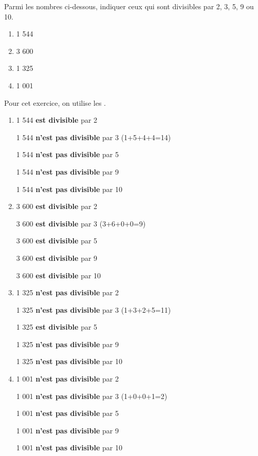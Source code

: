 
Parmi les nombres ci-dessous, indiquer ceux qui sont divisibles par 2, 3, 5, 9 ou 10.
\begin{enumerate}
     \item 1 544
     \item 3 600
     \item 1 325
     \item 1 001
\end{enumerate}
\begin{corrige}
Pour cet exercice, on utilise les .
     \begin{enumerate}
          \item 1 544 \textbf{est divisible} par 2
          \par
          1 544 \textbf{n'est pas divisible} par 3 (1+5+4+4=14)
          \par
          1 544 \textbf{n'est pas divisible} par 5
          \par
          1 544 \textbf{n'est pas divisible} par 9
          \par
          1 544 \textbf{n'est pas divisible} par 10
          \item 3 600\textbf{ est divisible} par 2
          \par
          3 600 \textbf{est divisible} par 3 (3+6+0+0=9)
          \par
          3 600 \textbf{est divisible} par 5
          \par
          3 600 \textbf{est divisible} par 9
          \par
          3 600 \textbf{est divisible} par 10
          \item 1 325\textbf{ n'est pas divisible} par 2
          \par
          1 325 \textbf{n'est pas divisible} par 3 (1+3+2+5=11)
          \par
          1 325 \textbf{est divisible} par 5
          \par
          1 325 \textbf{n'est pas divisible} par 9
          \par
          1 325 \textbf{n'est pas divisible} par 10
          \item 1 001\textbf{ n'est pas divisible} par 2
          \par
          1 001 \textbf{n'est pas divisible} par 3 (1+0+0+1=2)
          \par
          1 001 \textbf{n'est pas divisible} par 5
          \par
          1 001 \textbf{n'est pas divisible} par 9
          \par
          1 001 \textbf{n'est pas divisible} par 10
     \end{enumerate}
\end{corrige}

